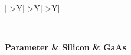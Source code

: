



\small

\begin{longtable}[htbp]{|
>{\setlength{\hsize}{0.5\hsize}}Y|
>{\setlength{\hsize}{0.5\hsize}}Y|
>{\setlength{\hsize}{0.5\hsize}}Y|} 
  \caption[Lombardi Surface Mobility Parameters]
   {Lombardi Surface Mobility Parameters \label{lombardi}}
\\
\hline

\color{white} \bf Parameter &
\color{white} \bf Silicon   &
\color{white} \bf GaAs     \endhead \hline 


\end{longtable}
